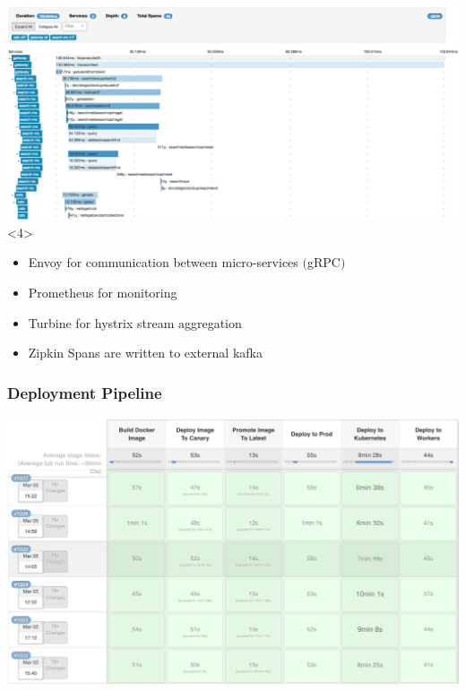 \documentclass[12pt]{beamer}
\begin{document}
\begin{frame}
\begin{center}
                \includegraphics[height=0.5\textheight]{images/zipkin.png}<4>
            \end{center}

            \begin{itemize}
                \item Envoy for communication between micro-services $($gRPC$)$
                \pause
                \item Prometheus for monitoring
                \pause
                \item Turbine for hystrix stream aggregation
                \pause
                \item Zipkin Spans are written to external kafka
            \end{itemize}
    \end{frame}

    \begin{frame}
        \frametitle{Deployment Pipeline}
        \begin{center}
            \includegraphics[width=1.00\textwidth]{images/pipeline.png}
        \end{center}
    \end{frame}
\end{document}
